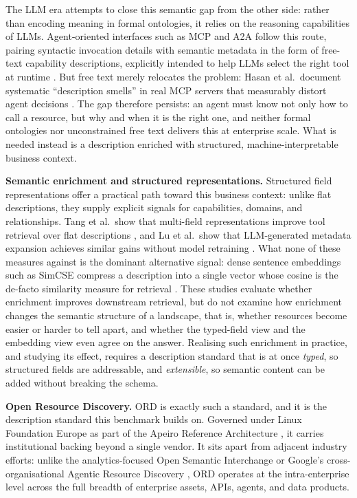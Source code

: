 \documentclass[10pt,twocolumn]{article}
\begin{document}
The LLM era attempts to close this semantic gap from the other side: rather than encoding meaning in formal ontologies, it relies on the reasoning capabilities of LLMs. Agent-oriented interfaces such as MCP and A2A follow this route, pairing syntactic invocation details with semantic metadata in the form of free-text capability descriptions, explicitly intended to help LLMs select the right tool at runtime \citep{noauthor_specification_nodate}. But free text merely relocates the problem: Hasan et al.\ document systematic ``description smells'' in real MCP servers that measurably distort agent decisions \citep{hasan_model_2026}. The gap therefore persists: an agent must know not only how to call a resource, but why and when it is the right one, and neither formal ontologies nor unconstrained free text delivers this at enterprise scale. What is needed instead is a description enriched with structured, machine-interpretable business context.

\textbf{Semantic enrichment and structured representations.}
Structured field representations offer a practical path toward this business context: unlike flat descriptions, they supply explicit signals for capabilities, domains, and relationships. Tang et al.\ show that multi-field representations improve tool retrieval over flat descriptions \citep{tang_multi-field_2026}, and Lu et al.\ show that LLM-generated metadata expansion achieves similar gains without model retraining \citep{lu_tools_2026}. What none of these measures against is the dominant alternative signal: dense sentence embeddings such as SimCSE compress a description into a single vector whose cosine is the de-facto similarity measure for retrieval \citep{gao_simcse_2021}. These studies evaluate whether enrichment improves downstream retrieval, but do not examine how enrichment changes the semantic structure of a landscape, that is, whether resources become easier or harder to tell apart, and whether the typed-field view and the embedding view even agree on the answer. Realising such enrichment in practice, and studying its effect, requires a description standard that is at once \emph{typed}, so structured fields are addressable, and \emph{extensible}, so semantic content can be added without breaking the schema.

\textbf{Open Resource Discovery.}
ORD \citep{linux_foundation_europe_open_nodate} is exactly such a standard, and it is the description standard this benchmark builds on. Governed under Linux Foundation Europe as part of the Apeiro Reference Architecture \citep{sap_se_apeiro_2026}, it carries institutional backing beyond a single vendor. It sits apart from adjacent industry efforts: unlike the analytics-focused Open Semantic Interchange \citep{the_open_semantic_interchange_authors_open_nodate} or Google's cross-organisational Agentic Resource Discovery \citep{bu_announcing_nodate}, ORD operates at the intra-enterprise level across the full breadth of enterprise assets, APIs, agents, and data products.
\end{document}
